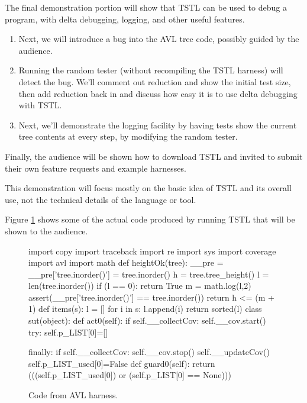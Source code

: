 \documentclass{sig-alternate}
\begin{document}
The final demonstration portion will show that TSTL can be used to
debug a program, with delta debugging, logging, and other useful
features.

\begin{enumerate}
\item Next, we will introduce a bug into the AVL tree code, possibly
  guided by the audience.
\item Running the random tester (without recompiling the TSTL harness)
  will detect the bug.  We'll comment out reduction and show the
  initial test size, then add reduction back in and discuss how easy
  it is to use delta debugging with TSTL.
\item Next, we'll demonstrate the logging facility by having tests
  show the current tree contents at every step, by modifying the
  random tester.
\end{enumerate}

Finally, the audience will be shown how to download TSTL and
  invited to submit their own feature requests and example harnesses.

This demonstration will focus mostly on the basic idea of TSTL and its
overall use, not the technical details of the language or tool.

Figure \ref{fig:code} shows some of the actual code produced by
running TSTL that will be shown to the audience.

\begin{figure}
\begin{code}
import copy
import traceback
import re
import sys
import coverage
import avl
import math
def heightOk(tree):
    \_\_pre = {}
    \_\_pre['tree.inorder()'] = tree.inorder()
    h = tree.tree\_height()
    l = len(tree.inorder())
    if (l == 0):
       return True
    m = math.log(l,2)
    assert(\_\_pre['tree.inorder()'] == 
           tree.inorder())
    return h <= (m + 1)
def items(s):
    l = []
    for i in s:
       l.append(i)
    return sorted(l)
class sut(object):
    def act0(self):
        if self.\_\_collectCov:
            self.\_\_cov.start()
        try:
            self.p\_LIST[0]=[]

        finally:
            if self.\_\_collectCov:
                self.\_\_cov.stop()
                self.\_\_updateCov()
        self.p\_LIST\_used[0]=False
    def guard0(self):
        return (((self.p\_LIST\_used[0]) or 
               (self.p\_LIST[0] == None)))
\end{code}
\caption{Code from AVL harness.}
\label{fig:code}
\end{figure}
\end{document}
